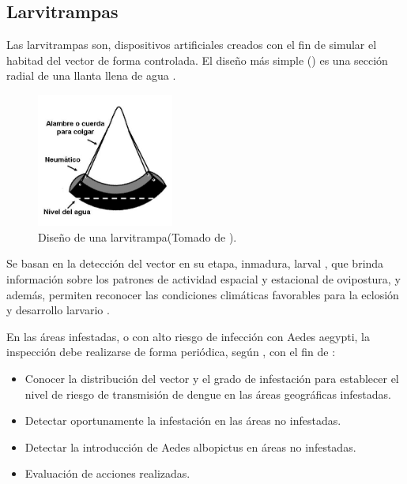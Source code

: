 \subsection{Larvitrampas}
\label{sec:densidad-vectorial-larvitrampas}
Las larvitrampas son, dispositivos artificiales creados con el fin de simular el habitad del
vector de forma controlada. El diseño más simple () es una sección
radial de una llanta llena de agua \cite{world2009dengue}.

\begin{figure}[H]
\centering
\includegraphics[width=0.4\textwidth]{capitulo-3/graphics/larvitrampa.png}
\caption{\label{fig:cap3-larvitrampas} Diseño de una larvitrampa(Tomado de
\cite{manualControlArg2009}).}
\end{figure}

Se basan en la detección del vector en su etapa, inmadura, larval
\cite{manualControlArg2009, MARQUES1993}, que brinda información sobre los patrones de actividad
espacial y estacional de ovipostura, y además, permiten reconocer las condiciones climáticas
favorables para la eclosión y desarrollo larvario \cite{manualControlArg2009}.

En las áreas infestadas, o con alto riesgo de infección con Aedes aegypti, la inspección debe
realizarse de forma periódica, según \cite{manualControlArg2009}, con el fin de :

\begin{itemize}
    \item Conocer la distribución del vector y el grado de infestación para establecer el nivel de riesgo de transmisión de dengue en las áreas geográficas infestadas.
    \item Detectar oportunamente la infestación en las áreas no infestadas.
    \item Detectar la introducción de Aedes albopictus en áreas no infestadas.
    \item Evaluación de acciones realizadas.
\end{itemize}

